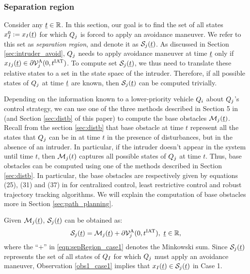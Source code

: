 \subsubsection{Separation region} \label{sec:sepRegion_case1}
Consider any $\underline{t} \in \mathbb{R}$. In this section, our goal is to find the set of all states $x_{I}^0 := x_{I}(\underline{t})$ for which $Q_j$ is forced to apply an avoidance maneuver. We refer to this set as \textit{separation region}, and denote it as $\mathcal{S}_j(\underline{t})$. As discussed in Section \ref{sec:intruder_avoid}, $Q_j$ needs to apply avoidance maneuver at time $\underline{t}$ only if $x_{I j}(\underline{t}) \in \partial \mathcal{V}^{\text{A}}_{j}(0, t^\text{IAT})$. To compute set $\mathcal{S}_j(\underline{t})$, we thus need to translate these relative states to a set in the state spaec of the intruder. Therefore, if all possible states of $Q_j$ at time $\underline{t}$ are known, then $\mathcal{S}_j(\underline{t})$ can be computed trivially.

Depending on the information known to a lower-priority vehicle $Q_i$ about $Q_j$'s control strategy, we can use one of the three methods described in Section 5 in \cite{chen2016robust} (and Section \ref{sec:distb} of this paper) to compute the base obstacles $\mathcal{M}_j(\underline{t})$. Recall from the section \ref{sec:distb} that base obstacle at time $t$ represent all the states that $Q_j$ can be in at time $t$ in the presence of disturbances, but in the absence of an intruder. In particular, if the intruder doesn't appear in the system until time $t$, then  $\mathcal{M}_j(t)$ captures all possible states of $Q_j$ at time $t$. Thus, base obstacles can be computed using one of the methods described in Section \ref{sec:distb}. In particular, the base obstacles are respectively given by equations (25), (31) and (37) in \cite{chen2016robust} for centralized control, least restrictive control and robust trajectory tracking algorithms. We will explain the computation of base obstacles more in Section \ref{sec:path_planning}.

Given $\mathcal{M}_j(\underline{t})$, $\mathcal{S}_j(\underline{t})$ can be obtained as:
\begin{equation} \label{eqn:sepRegion_case1}
\sep_j(\tsa) = \boset_j(\tsa) + \partial \brs^{\text{A}}_{j}(0, \iat), ~\tsa \in \R,
\end{equation}
where the ``$+$'' in \eqref{eqn:sepRegion_case1} denotes the Minkowski sum. Since $\mathcal{S}_j(\underline{t})$ represents the set of all states of $Q_I$ for which $Q_j$ must apply an avoidance maneuver, Observation \ref{obs1_case1} implies that $x_{I}(\underline{t}) \in \mathcal{S}_j(\underline{t})$ in Case 1.